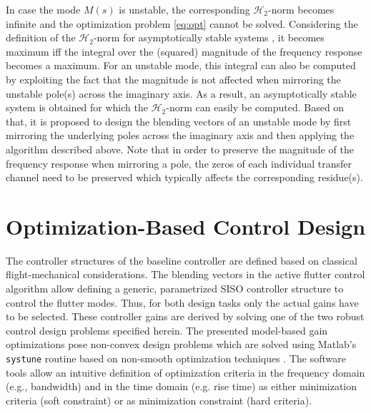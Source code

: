 \documentclass[aerospace,article,submit,moreauthors,pdftex,10pt,a4paper]{Definitions/mdpi}
\begin{document}
In case the mode $M(s)$ is unstable, the corresponding $\mathcal{H}_2$-norm becomes infinite and the optimization problem \eqref{eq:opt} cannot be solved. Considering the definition of the $\mathcal{H}_2$-norm for asymptotically stable systems \cite{Skoge_05}, it becomes maximum iff the integral over the (squared) magnitude of the frequency response becomes a maximum. For an unstable mode, this integral can also be computed by exploiting the fact that  the magnitude is not affected when mirroring the unstable pole(s) across the imaginary axis. As a result, an asymptotically stable system is obtained for which the $\mathcal{H}_2$-norm can easily be computed. 
Based on that, it is proposed to design the blending vectors of an unstable mode by first mirroring the underlying poles across the imaginary axis and then applying the algorithm described above. Note that in order to preserve the magnitude of the frequency response when mirroring a pole, the zeros of each individual transfer channel need to be preserved which typically affects the corresponding residue(s).






\section{Optimization-Based Control Design}\label{sec:opt}
The controller structures of the baseline controller are defined based on classical flight-mechanical considerations. The blending vectors in the active flutter control algorithm allow defining a generic, parametrized SISO controller structure to control the flutter modes. Thus, for both design tasks only the actual gains have to be selected. 
These controller gains are derived by solving one of the two  robust control design problems specified herein. The presented  model-based gain optimizations pose non-convex design problems which are solved  using Matlab's \texttt{systune} routine based on non-smooth optimization techniques \cite{Apkarian06}.
The software tools allow an intuitive definition of optimization criteria  in the frequency domain (e.g., bandwidth) and in the time domain (e.g. rise time)  as either minimization criteria (soft constraint) or as minimization constraint (hard criteria). 
\end{document}
